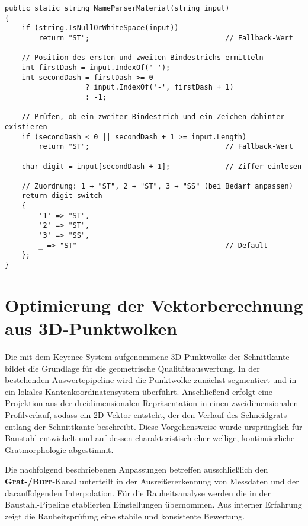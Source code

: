 \begin{lstlisting}[language={[Sharp]C}, caption={Werkstoffabhängiges Routing der Handscanner-Setups}, label={lst:messzellen-routing}]
public static string NameParserMaterial(string input)
{
    if (string.IsNullOrWhiteSpace(input))
        return "ST";                                // Fallback-Wert

    // Position des ersten und zweiten Bindestrichs ermitteln
    int firstDash = input.IndexOf('-');
    int secondDash = firstDash >= 0
                   ? input.IndexOf('-', firstDash + 1)
                   : -1;

    // Prüfen, ob ein zweiter Bindestrich und ein Zeichen dahinter existieren
    if (secondDash < 0 || secondDash + 1 >= input.Length)
        return "ST";                                // Fallback-Wert

    char digit = input[secondDash + 1];             // Ziffer einlesen

    // Zuordnung: 1 → "ST", 2 → "ST", 3 → "SS" (bei Bedarf anpassen)
    return digit switch
    {
        '1' => "ST",
        '2' => "ST",
        '3' => "SS",
        _ => "ST"                                   // Default
    };
}
\end{lstlisting}

\section{Optimierung der Vektorberechnung aus 3D-Punktwolken}

Die mit dem Keyence-System aufgenommene 3D-Punktwolke der Schnittkante bildet die Grundlage für die geometrische Qualitätsauswertung. In der bestehenden Auswertepipeline wird die Punktwolke zunächst segmentiert und in ein lokales Kantenkoordinatensystem überführt. Anschließend erfolgt eine Projektion aus der dreidimensionalen Repräsentation in einen zweidimensionalen Profilverlauf, sodass ein 2D-Vektor entsteht, der den Verlauf des Schneidgrats entlang der Schnittkante beschreibt. Diese Vorgehensweise wurde ursprünglich für Baustahl entwickelt und auf dessen charakteristisch eher wellige, kontinuierliche Gratmorphologie abgestimmt.

Die nachfolgend beschriebenen Anpassungen betreffen ausschließlich den \textbf{Grat-/Burr}-Kanal unterteilt in der Ausreißererkennung von Messdaten und der darauffolgenden Interpolation. Für die Rauheitsanalyse werden die in der Baustahl-Pipeline etablierten Einstellungen übernommen. Aus interner Erfahrung zeigt die Rauheitsprüfung eine stabile und konsistente Bewertung.

